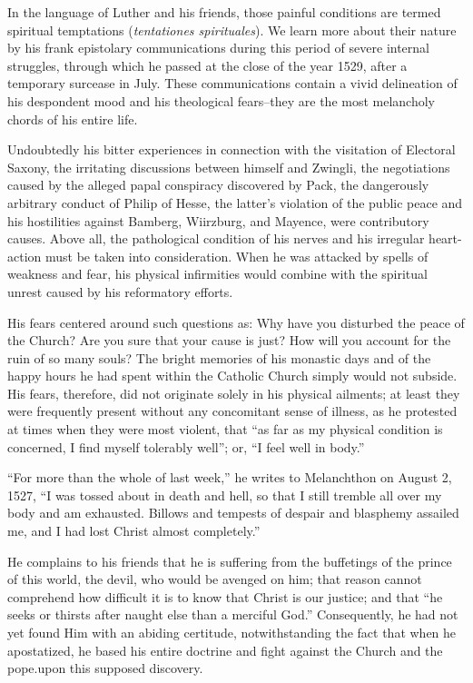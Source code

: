 In the language of Luther and his friends, those painful conditions
are termed spiritual temptations (\textit{tentationes spirituales}). We learn
more about their nature by his frank epistolary communications
during this period of severe internal struggles, through which he passed
at the close of the year 1529, after a temporary surcease in July.
These communications contain a vivid delineation of his despondent
mood and his theological fears--they are the most melancholy chords
of his entire life.

Undoubtedly his bitter experiences in connection with the visitation
of Electoral Saxony, the irritating discussions between himself and
Zwingli, the negotiations caused by the alleged papal conspiracy
discovered by Pack, the dangerously arbitrary conduct of Philip
of Hesse, the latter’s violation of the public peace and his hostilities
against Bamberg, Wiirzburg, and Mayence, were contributory causes.
Above all, the pathological condition of his nerves and his irregular
heart-action must be taken into consideration. When he was attacked
by spells of weakness and fear, his physical infirmities would
combine with the spiritual unrest caused by his reformatory efforts.

His fears centered around such questions as: Why have you disturbed
the peace of the Church? Are you sure that your cause is just? How
will you account for the ruin of so many souls? The bright memories
of his monastic days and of the happy hours he had spent within the
Catholic Church simply would not subside. His fears, therefore, did
not originate solely in his physical ailments; at least they were frequently
present without any concomitant sense of illness, as he protested
at times when they were most violent, that “as far as my physical
condition is concerned, I find myself tolerably well”; or, “I feel
well in body.”

“For more than the whole of last week,” he writes to Melanchthon
on August 2, 1527, “I was tossed about in death and hell, so that I
still tremble all over my body and am exhausted. Billows and
tempests of despair and blasphemy assailed me, and I had lost Christ
almost completely.”

He complains to his friends that he is suffering from the buffetings of the
prince of this world, the devil, who would be avenged on him; that reason
cannot comprehend how difficult it is to know that Christ is our justice;
and that “he seeks or thirsts after naught else than a merciful God.”
Consequently, he had not yet found Him with an abiding certitude, notwithstanding
the fact that when he apostatized, he based his entire doctrine and fight
against the Church and the pope.upon this supposed discovery.

